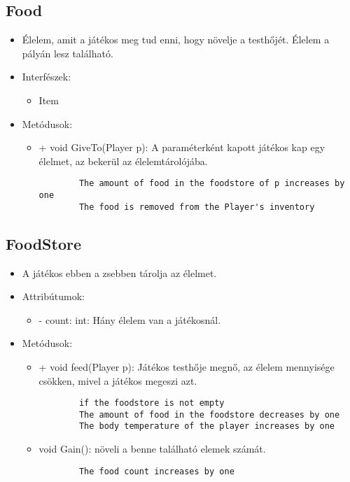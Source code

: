 \subsection{Food}
\begin{itemize}
	\item Élelem, amit a játékos meg tud enni, hogy növelje a testhőjét. Élelem a pályán lesz található.
	\item Interfészek:
	\begin{itemize}
		\item Item
	\end{itemize}
	\item Metódusok:
	\begin{itemize}
		\item + void GiveTo(Player p): A paraméterként kapott játékos kap egy élelmet, az bekerül az élelemtárolójába.
		\begin{lstlisting}
		The amount of food in the foodstore of p increases by one
		The food is removed from the Player's inventory
		\end{lstlisting}
	\end{itemize}
\end{itemize}

\subsection{FoodStore}
\begin{itemize}
	\item A játékos ebben a zsebben tárolja az élelmet.
	\item Attribútumok:
	\begin{itemize}
		\item - count: int: Hány élelem van a játékosnál.
	\end{itemize}
	\item Metódusok:
	\begin{itemize}
		\item + void feed(Player p): Játékos testhője megnő, az élelem mennyisége csökken, mivel a játékos megeszi azt.
		\begin{lstlisting}
		if the foodstore is not empty
		The amount of food in the foodstore decreases by one
		The body temperature of the player increases by one
		\end{lstlisting}
		\item void Gain(): növeli a benne található elemek számát.
		\begin{lstlisting}
		The food count increases by one
		\end{lstlisting}
	\end{itemize}
\end{itemize}


